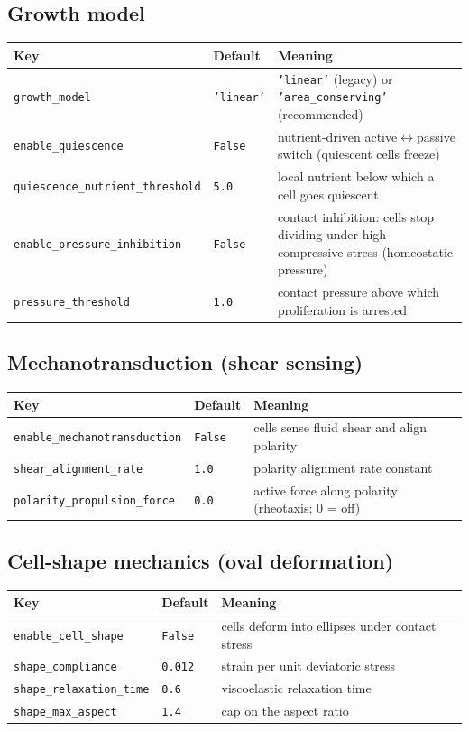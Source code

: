 \documentclass[11pt]{article}
\newcommand{\code}[1]{\texttt{#1}}
\begin{document}
\subsection{Growth model}
\begin{longtable}{p{} p{} p{}}
\toprule
Key & Default & Meaning \\ \midrule \endhead
\code{growth\_model} & \code{'linear'} & \code{'linear'} (legacy) or \code{'area\_conserving'} (recommended) \\
\code{enable\_quiescence} & \code{False} & nutrient-driven active$\leftrightarrow$passive switch (quiescent cells freeze) \\
\code{quiescence\_nutrient\_threshold} & \code{5.0} & local nutrient below which a cell goes quiescent \\
\code{enable\_pressure\_inhibition} & \code{False} & contact inhibition: cells stop dividing under high compressive stress (homeostatic pressure) \\
\code{pressure\_threshold} & \code{1.0} & contact pressure above which proliferation is arrested \\
\bottomrule
\end{longtable}

\subsection{Mechanotransduction (shear sensing)}
\begin{longtable}{p{} p{} p{}}
\toprule
Key & Default & Meaning \\ \midrule \endhead
\code{enable\_mechanotransduction} & \code{False} & cells sense fluid shear and align polarity \\
\code{shear\_alignment\_rate} & \code{1.0} & polarity alignment rate constant \\
\code{polarity\_propulsion\_force} & \code{0.0} & active force along polarity (rheotaxis; 0 = off) \\
\bottomrule
\end{longtable}

\subsection{Cell-shape mechanics (oval deformation)}
\begin{longtable}{p{} p{} p{}}
\toprule
Key & Default & Meaning \\ \midrule \endhead
\code{enable\_cell\_shape} & \code{False} & cells deform into ellipses under contact stress \\
\code{shape\_compliance} & \code{0.012} & strain per unit deviatoric stress \\
\code{shape\_relaxation\_time} & \code{0.6} & viscoelastic relaxation time \\
\code{shape\_max\_aspect} & \code{1.4} & cap on the aspect ratio \\
\bottomrule
\end{longtable}
\end{document}
